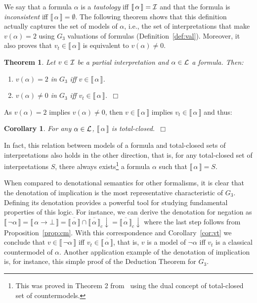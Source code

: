 \documentclass{tlp}
\def\cI{{\cal I}}
\def\down{\downarrow}
\def\L{{\cal L}}
\newcommand\non[1]{\overline{#1} }
\newcommand{\den}[1]{\llbracket \, #1 \, \rrbracket}
\def\qed{~\hfill$\Box$}
\newtheorem{theorem}{Theorem}
\newtheorem{corollary}{Corollary}
\begin{document}
We say that a formula $\alpha$ is a \emph{tautology} iff $\den\alpha=\cI$ and that the formula is \emph{inconsistent} iff $\den\alpha=\emptyset$. The following theorem shows that this definition actually captures the set of models of $\alpha$, i.e., the set of interpretations that make $v(\alpha)=2$ using $G_3$ valuations of formulas (Definition~\ref{def:val}). Moreover, it also proves that $v_t \in \den{\alpha}$ is equivalent to $v(\alpha)\neq 0$.

\begin{theorem}\label{th:den-g3} 
Let $v \in \cI$ be a partial interpretation and $\alpha \in \L$ a formula. Then:
\begin{enumerate}
\item[\rm (i)] $v(\alpha)=2$ in $G_3$ iff $v \in \den\alpha$.
\item[\rm (ii)] $v(\alpha) \neq 0$ in $G_3$ iff $v_t \in \den\alpha$.\qed
\end{enumerate}
\end{theorem}

\noindent As $v(\alpha)=2$ implies $v(\alpha)\neq 0$, then $v\in \den\alpha$ implies $v_t \in \den\alpha$ and thus: 
\begin{corollary}\label{cor:vt1}
For any $\alpha \in \L$, $\den\alpha$ is total-closed.\qed
\end{corollary}

\noindent In fact, this relation between models of a formula and total-closed sets of interpretations also holds in the other direction, that is, for any total-closed set of interpretations $S$, there always exists\footnote{This was proved in Theorem 2 from~\cite{CF07} using the dual concept of total-closed set of countermodels.} a formula $\alpha$ such that $\den\alpha = S$.

When compared to denotational semantics for other formalisms, it is clear that the denotation of implication is the most representative characteristic of $G_3$. Defining its denotation provides a powerful tool for studying fundamental properties of this logic. For instance, we can derive the denotation for negation as $\den{\neg \alpha}=\den{\alpha \rightarrow \bot}= \non{\den{\alpha}} \cap \non{\den{\alpha}}_c \down = \non{\den{\alpha}}_c \down$ where the last step follows from Proposition~\ref{prop:cm}. With this correspondence and Corollary~\ref{cor:vt} we conclude that $v \in \den{\neg \alpha} $ iff $v_t \in \non{\den{\alpha}}$, that is, $v$ is a model of $\neg \alpha$ iff $v_t$ is a classical countermodel of $\alpha$. Another application example of the denotation of implication is, for instance, this simple proof of the Deduction Theorem for $G_3$.
\end{document}
